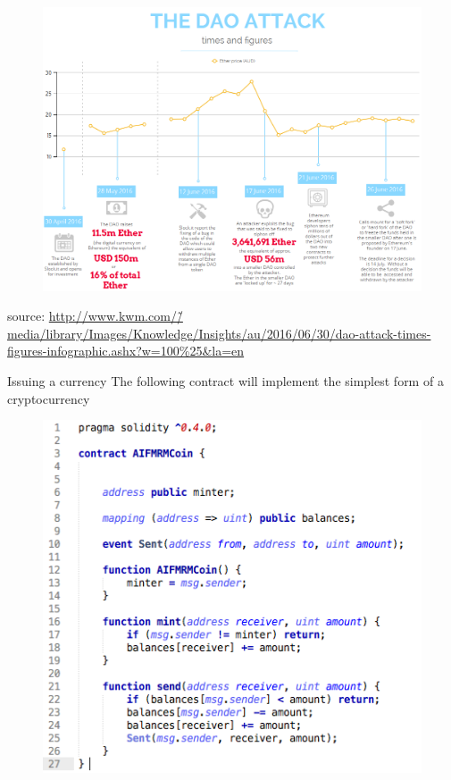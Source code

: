 \documentclass[9pt]{beamer}
\begin{document}
\begin{frame}{}
	\begin{figure}[]
		\centering
		\includegraphics  [scale=0.3]{Images/dao-attack}
	\end{figure}
	\begin{scriptsize}
		source: \href{http://www.kwm.com/en/knowledge/insights/smart-contracts-open-source-model-dna-digital-analogue-human-20160630}{http://www.kwm.com/\~/media/library/Images/Knowledge/Insights/au/2016/06/30/dao-attack-times-figures-infographic.ashx?w=100\%25\&la=en}
	\end{scriptsize}
\end{frame}


\begin{frame}{Issuing a currency}
	The following contract will implement the simplest form of a cryptocurrency
	\begin{figure}[]
		\centering
		\includegraphics  [scale=0.4]{Images/contract1}
	\end{figure}
\end{frame}
\end{document}
